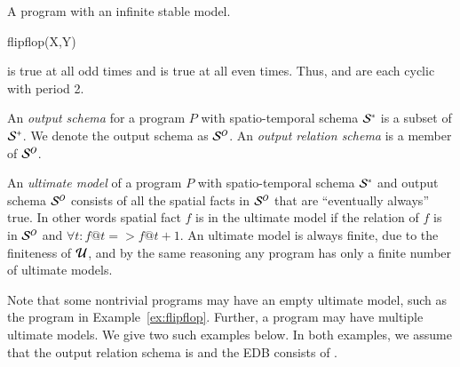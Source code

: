 
\begin{example}
\label{ex:flipflop}
A \lang program with an infinite stable model.

\begin{Drules}
        {flipflop(X,Y)}
\end{Drules}

 is true at all odd times and  is true at all even times.  Thus,  and  are each cyclic with period 2.
\end{example}

An {\em output schema} for a \lang program $P$ with spatio-temporal schema
$\stschema$ is a subset of $\sschema$.  We denote the output schema as
$\oschema$. An \emph{output relation schema} is a member of $\oschema$.

An {\em ultimate model} of a \lang program $P$ with spatio-temporal schema
$\stschema$ and output schema $\oschema$ consists of all the spatial facts in
$\oschema$ that are ``eventually always'' true.  In other words spatial fact $f$
is in the ultimate model if the relation of $f$ is in $\oschema$ and $\forall t
: f@t => f@t+1$.  An ultimate model
is always finite, due to the finiteness of $\univ$, and by the same reasoning
any \lang program has only a finite number of ultimate models.

Note that some nontrivial programs may have an empty ultimate model, such as the
program in Example~\ref{ex:flipflop}.  Further, a \lang program may have
multiple ultimate models.  We give two such examples below. In both examples, we
assume that the output relation schema is  and the EDB consists of
.

